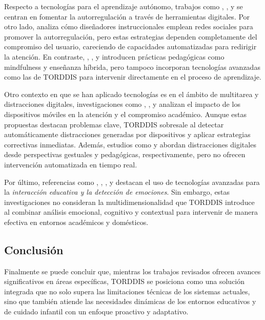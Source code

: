 \documentclass[a4paper,fleqn]{cas-sc}
\begin{document}
				Respecto a tecnologías para el aprendizaje autónomo, trabajos como \cite{Bembich2016Future}, \cite{Roberts2020Task}, y \cite{Peters2003Self} se centran en fomentar la autorregulación a través de herramientas digitales. Por otro lado, \cite{Muljana2022Instructional} analiza cómo diseñadores instruccionales emplean redes sociales para promover la autorregulación, pero estas estrategias dependen completamente del compromiso del usuario, careciendo de capacidades automatizadas para redirigir la atención. En contraste, \cite{Palmer2022impact}, \cite{Adcroft2018Developing}, y \cite{Salter2014Exploring} introducen prácticas pedagógicas como mindfulness y enseñanza híbrida, pero tampoco incorporan tecnologías avanzadas como las de TORDDIS para intervenir directamente en el proceso de aprendizaje.
				
				Otro contexto en que se han aplicado tecnologías es en el ámbito de multitarea y distracciones digitales, investigaciones como \cite{Hartley2022Smartphone}, \cite{Labar2019Interplay}, y \cite{Farsani2020} analizan el impacto de los dispositivos móviles en la atención y el compromiso académico. Aunque estas propuestas destacan problemas clave, TORDDIS sobresale al detectar automáticamente distracciones generadas por dispositivos y aplicar estrategias correctivas inmediatas. Además, estudios como \cite{Erazo2016Easing} y \cite{Wang2022Empowering} abordan distracciones digitales desde perspectivas gestuales y pedagógicas, respectivamente, pero no ofrecen intervención automatizada en tiempo real.
				
				Por último, referencias como \cite{Kulkarni2023 }, \cite{Enadula2021}, \cite{Ozdamli2022}, y \cite{Warren2015Brief} destacan el uso de tecnologías avanzadas para la \textit{interacción educativa y la detección de emociones}. Sin embargo, estas investigaciones no consideran la multidimensionalidad que TORDDIS introduce al combinar análisis emocional, cognitivo y contextual para intervenir de manera efectiva en entornos académicos y domésticos.
				
			\subsection{Conclusión}
				Finalmente se puede concluir que, mientras los trabajos revisados ofrecen avances significativos en áreas específicas, TORDDIS se posiciona como una solución integrada que no solo supera las limitaciones técnicas de los sistemas actuales, sino que también atiende las necesidades dinámicas de los entornos educativos y de cuidado infantil con un enfoque proactivo y adaptativo.
			
\end{document}
